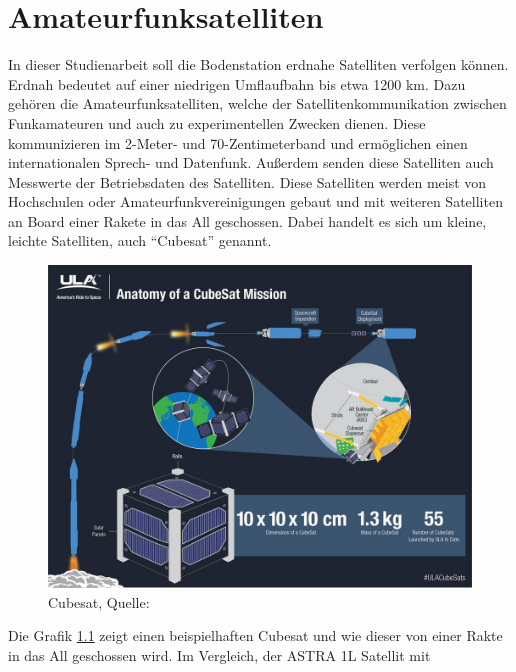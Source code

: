 
\chapter{Amateurfunksatelliten}
In dieser Studienarbeit soll die Bodenstation erdnahe Satelliten verfolgen können. Erdnah bedeutet auf einer niedrigen Umflaufbahn bis etwa 1200 km. 
Dazu gehören die Amateurfunksatelliten, welche der Satellitenkommunikation zwischen Funkamateuren und auch zu experimentellen Zwecken dienen. 
Diese kommunizieren im 2-Meter- und 70-Zentimeterband \cite{Wiki:amateur} und ermöglichen einen internationalen Sprech- und Datenfunk. Außerdem senden diese Satelliten
auch Messwerte der Betriebsdaten des Satelliten. Diese Satelliten werden meist von Hochschulen oder Amateurfunkvereinigungen gebaut und mit weiteren 
Satelliten an Board einer Rakete in das All geschossen. Dabei handelt es sich um kleine, leichte Satelliten, auch ``Cubesat'' genannt.
\begin{figure}[h]
 \centering
 \includegraphics[width=0.8\linewidth]{./images/cubesat}
 \caption{Cubesat, Quelle: \cite{cubesat}}
 \label{fig:cubesat}
\end{figure}
Die Grafik \ref{fig:cubesat} zeigt einen beispielhaften Cubesat und wie dieser von einer Rakte in das All geschossen wird. Im Vergleich, der ASTRA 1L Satellit mit 
